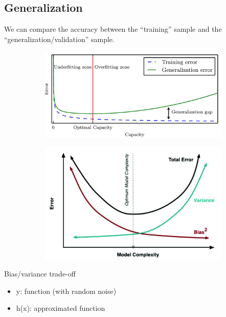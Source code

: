\subsection{Generalization}

We can compare the accuracy between the “training” sample and the “generalization/validation” sample.\\

\begin{figure}[ht]
	\centering
	\begin{subfigure}{.5\textwidth}
		\centering
		\includegraphics[width=1\linewidth]{figure_ml/generalization.png}
	\end{subfigure}%
	\begin{subfigure}{.5\textwidth}
		\centering
		\includegraphics[width=1\linewidth]{figure_ml/generalization2.png}
	\end{subfigure}

\end{figure}



Bias/variance trade-off
\begin{itemize}
	\item y: function (with random noise)
	\item h(x): approximated function
\end{itemize}


